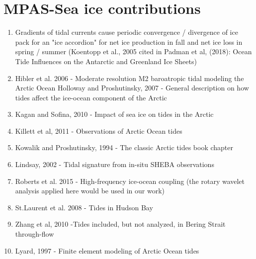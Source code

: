 \section{MPAS-Sea ice contributions}
\begin{enumerate}
    \item Gradients of tidal currents cause periodic convergence / divergence of ice pack for an "ice accordion" for net ice production in fall and net ice loss in spring / summer (Koentopp et al., 2005 cited in Padman et al, (2018): Ocean Tide Influences on the Antarctic and Greenland Ice Sheets)
    \item Hibler et al. 2006 - Moderate resolution M2 baroatropic tidal modeling the Arctic Ocean
    Holloway and Proshutinsky, 2007 - General description on how tides affect the ice-ocean component of the Arctic
    \item Kagan and Sofina, 2010 - Impact of sea ice on tides in the Arctic
    \item Killett et al, 2011 - Observations of Arctic Ocean tides
    \item Kowalik and Proshutinsky, 1994 - The classic Arctic tides book chapter
    \item Lindsay, 2002 - Tidal signature from in-situ SHEBA observations
    \item Roberts et al. 2015 - High-frequency ice-ocean coupling (the rotary wavelet analysis applied here would be used in our work)
    \item St.Laurent et al. 2008 - Tides in Hudson Bay
    \item Zhang et al, 2010 -Tides included, but not analyzed, in Bering Strait through-flow
    \item Lyard, 1997 - Finite element modeling of Arctic Ocean tides
\end{enumerate}

